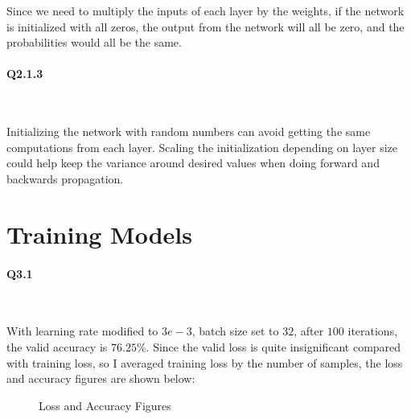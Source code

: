 \documentclass[11pt]{article} \usepackage{fullpage} \usepackage{graphicx} \usepackage{epstopdf} \usepackage{color} \usepackage{psfrag} \usepackage{pdfsync}\usepackage{indentfirst}\usepackage{subfigure}\usepackage{float}\usepackage[section]{placeins}
\begin{document}
Since we need to multiply the inputs of each layer by the weights, if the network is initialized with all zeros, the output from the network will all be zero, and the probabilities would all be the same.

\paragraph{Q2.1.3}~{}

Initializing the network with random numbers can avoid getting the same computations from each layer. Scaling the initialization depending on layer size could help keep the variance around desired values when doing forward and backwards propagation.

\section{Training Models}

\paragraph{Q3.1}~{}

With learning rate modified to $3e-3$, batch size set to $32$, after $100$ iterations, the valid accuracy is $76.25\%$. Since the valid loss is quite insignificant compared with training loss, so I averaged training loss by the number of samples, the loss and accuracy figures are shown below:
\begin{figure}[H]
\centering
{}
\caption{Loss and Accuracy Figures}
\end{figure}
\end{document}
